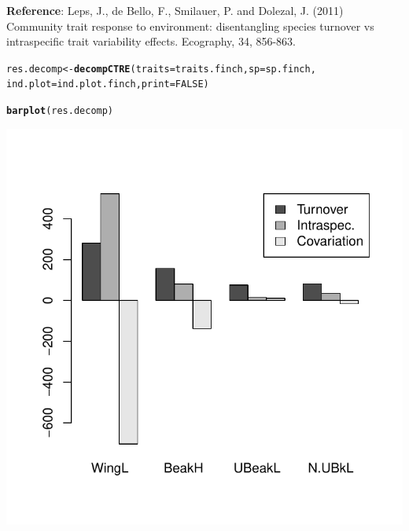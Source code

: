 \documentclass[12pt]{article}\usepackage[]{graphicx}\usepackage[]{color}
\makeatletter
\def\maxwidth{ %
  \ifdim\Gin@nat@width>\linewidth
    \linewidth
  \else
    \Gin@nat@width
  \fi
}
\newcommand{\hlnum}[1]{\textcolor[rgb]{0.686,0.059,0.569}{#1}}%
\newcommand{\hlstd}[1]{\textcolor[rgb]{0.345,0.345,0.345}{#1}}%
\newcommand{\hlkwb}[1]{\textcolor[rgb]{0.69,0.353,0.396}{#1}}%
\newcommand{\hlkwc}[1]{\textcolor[rgb]{0.333,0.667,0.333}{#1}}%
\newcommand{\hlkwd}[1]{\textcolor[rgb]{0.737,0.353,0.396}{\textbf{#1}}}%
\newenvironment{kframe}{%
 \def\at@end@of@kframe{}%
 \ifinner\ifhmode%
  \def\at@end@of@kframe{\end{minipage}}%
  \begin{minipage}{\columnwidth}%
 \fi\fi%
 \def\FrameCommand##1{\hskip\@totalleftmargin \hskip-\fboxsep
 \colorbox{shadecolor}{##1}\hskip-\fboxsep
     \hskip-\linewidth \hskip-\@totalleftmargin \hskip\columnwidth}%
 \MakeFramed {\advance\hsize-\width
   \@totalleftmargin\z@ \linewidth\hsize
   \@setminipage}}%
 {\par\unskip\endMakeFramed%
 \at@end@of@kframe}
\newenvironment{knitrout}{}{} %
\makeatother
\begin{document}
\textbf{Reference}: Leps, J., de Bello, F., Smilauer, P. and Dolezal, J. (2011) Community trait response to environment: disentangling species turnover vs intraspecific trait variability effects. Ecography, 34, 856-863.

\begin{knitrout}
\color{fgcolor}\begin{kframe}
\begin{alltt}
\hlstd{res.decomp}\hlkwb{<-}\hlkwd{decompCTRE}\hlstd{(}\hlkwc{traits} \hlstd{= traits.finch,} \hlkwc{sp} \hlstd{= sp.finch,}
              \hlkwc{ind.plot} \hlstd{= ind.plot.finch,} \hlkwc{print} \hlstd{=} \hlnum{FALSE}\hlstd{)}

\hlkwd{barplot}\hlstd{(res.decomp)}
\end{alltt}
\end{kframe}

{\centering \includegraphics[width=\maxwidth]{figure/unnamed-chunk-22} 

}



\end{knitrout}
\end{document}
